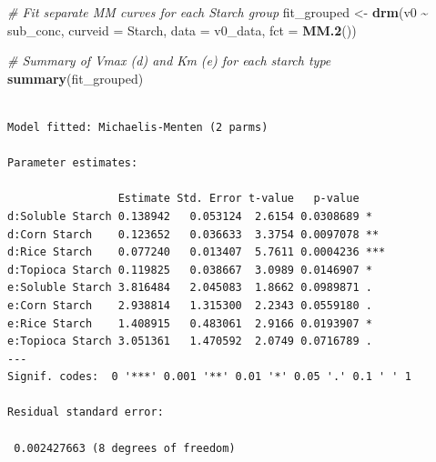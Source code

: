 \documentclass[
  12pt,
]{article}
\newenvironment{Shaded}{\begin{snugshade}}{\end{snugshade}}
\newcommand{\AttributeTok}[1]{\textcolor[rgb]{0.13,0.29,0.53}{#1}}
\newcommand{\CommentTok}[1]{\textcolor[rgb]{0.56,0.35,0.01}{\textit{#1}}}
\newcommand{\ConstantTok}[1]{\textcolor[rgb]{0.56,0.35,0.01}{#1}}
\newcommand{\DecValTok}[1]{\textcolor[rgb]{0.00,0.00,0.81}{#1}}
\newcommand{\FloatTok}[1]{\textcolor[rgb]{0.00,0.00,0.81}{#1}}
\newcommand{\FunctionTok}[1]{\textcolor[rgb]{0.13,0.29,0.53}{\textbf{#1}}}
\newcommand{\NormalTok}[1]{#1}
\newcommand{\OtherTok}[1]{\textcolor[rgb]{0.56,0.35,0.01}{#1}}
\newcommand{\SpecialCharTok}[1]{\textcolor[rgb]{0.81,0.36,0.00}{\textbf{#1}}}
\newcommand{\StringTok}[1]{\textcolor[rgb]{0.31,0.60,0.02}{#1}}
\begin{document}
\begin{Shaded}
\begin{Highlighting}[]
\CommentTok{\# Fit separate MM curves for each Starch group}
\NormalTok{fit\_grouped }\OtherTok{\textless{}{-}} \FunctionTok{drm}\NormalTok{(v0 }\SpecialCharTok{\textasciitilde{}}\NormalTok{ sub\_conc, }\AttributeTok{curveid =}\NormalTok{ Starch, }
                   \AttributeTok{data =}\NormalTok{ v0\_data, }\AttributeTok{fct =} \FunctionTok{MM.2}\NormalTok{())}

\CommentTok{\# Summary of Vmax (d) and Km (e) for each starch type}
\FunctionTok{summary}\NormalTok{(fit\_grouped)}
\end{Highlighting}
\end{Shaded}

\begin{verbatim}

Model fitted: Michaelis-Menten (2 parms)

Parameter estimates:

                 Estimate Std. Error t-value   p-value    
d:Soluble Starch 0.138942   0.053124  2.6154 0.0308689 *  
d:Corn Starch    0.123652   0.036633  3.3754 0.0097078 ** 
d:Rice Starch    0.077240   0.013407  5.7611 0.0004236 ***
d:Topioca Starch 0.119825   0.038667  3.0989 0.0146907 *  
e:Soluble Starch 3.816484   2.045083  1.8662 0.0989871 .  
e:Corn Starch    2.938814   1.315300  2.2343 0.0559180 .  
e:Rice Starch    1.408915   0.483061  2.9166 0.0193907 *  
e:Topioca Starch 3.051361   1.470592  2.0749 0.0716789 .  
---
Signif. codes:  0 '***' 0.001 '**' 0.01 '*' 0.05 '.' 0.1 ' ' 1

Residual standard error:

 0.002427663 (8 degrees of freedom)
\end{verbatim}

\begin{Shaded}
\end{Shaded}
\end{document}
